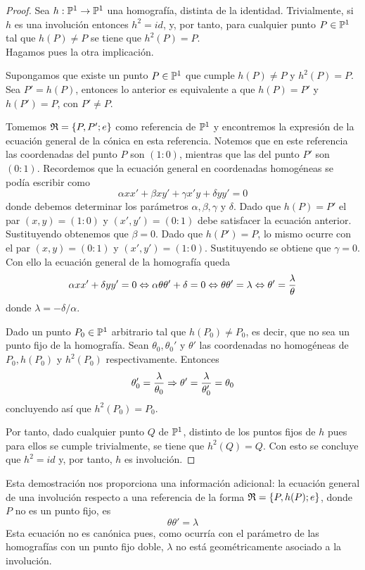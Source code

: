 \begin{proof}
	Sea $h:\mathbb{P}^1\rightarrow\mathbb{P}^1$ una homografía, distinta de la identidad. Trivialmente, si $h$ es una involución entonces $h^2=id$, y, por tanto, para cualquier punto $P\in\mathbb{P}^1$ tal que $h(P)\not=P$ se tiene que $h^2(P)=P$.\\
	
	Hagamos pues la otra implicación.
	
	Supongamos que existe un punto $P\in\mathbb{P}^1$ que cumple $h(P)\not=P$ y $h^2(P)=P$. Sea $P'=h(P)$, entonces lo anterior es equivalente a que $h(P)=P'$ y $h(P')=P$, con $P'\not=P$.
	
	Tomemos $\mathfrak{R}=\{P,P';e\}$ como referencia de $\mathbb{P}^1$ y encontremos la expresión de la ecuación general de la cónica en esta referencia. Notemos que en este referencia las coordenadas del punto $P$ son $(1:0)$, mientras que las del punto $P'$ son $(0:1)$. Recordemos que la ecuación general en coordenadas homogéneas se podía escribir como
	\begin{equation*}
		\alpha xx'+\beta xy'+\gamma x'y+\delta yy'=0
	\end{equation*}
	donde debemos determinar los parámetros $\alpha,\beta,\gamma$ y $\delta$. Dado que $h(P)=P'$ el par $(x,y)=(1:0)$ y $(x',y')=(0:1)$ debe satisfacer la ecuación anterior. Sustituyendo obtenemos que $\beta=0$. Dado que $h(P')=P$, lo mismo ocurre con el par $(x,y)=(0:1)$ y $(x',y')=(1:0)$. Sustituyendo se obtiene que $\gamma=0$. Con ello la ecuación general de la homografía queda
	\begin{equation*}
		\alpha xx'+\delta yy'=0\Leftrightarrow \alpha\theta\theta'+\delta=0\Leftrightarrow \theta\theta'=\lambda\Leftrightarrow \theta'=\frac{\lambda}{\theta}
	\end{equation*}
	donde $\lambda=-\delta/\alpha$. 
	
	Dado un punto $P_0\in \mathbb{P}^1$ arbitrario tal que $h(P_0)\not=P_0$, es decir, que no sea un punto fijo de la homografía. Sean $\theta_0,\theta_0'$ y $ \theta'$ las coordenadas no homogéneas de $P_0,h(P_0)$ y $h^2(P_0)$ respectivamente. Entonces
	\begin{equation*}
		\theta_0'=\frac{\lambda}{\theta_0}\Rightarrow \theta'=\frac{\lambda}{\theta_0'}=\theta_0
	\end{equation*}
	concluyendo así que $h^2(P_0)=P_0$. 
	
	Por tanto, dado cualquier punto $Q$ de $\mathbb{P}^1$, distinto de los puntos fijos de $h$ pues para ellos se cumple trivialmente, se tiene que $h^2(Q)=Q$. Con esto se concluye que $h^2=id$ y, por tanto, $h$ es involución.
\end{proof}
Esta demostración nos proporciona una información adicional: la ecuación general de una involución respecto a una referencia de la forma $\mathfrak{R}=\{P,h(P);e\}$, donde $P$ no es un punto fijo, es
\begin{equation}
 \theta\theta'=\lambda
\end{equation}
Esta ecuación no es canónica pues, como ocurría con el parámetro de las homografías con un punto fijo doble, $\lambda$ no está geométricamente asociado a la involución.

